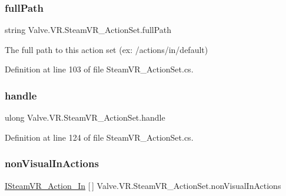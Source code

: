 \subsubsection{\texorpdfstring{fullPath}{fullPath}}
{\footnotesize\ttfamily string Valve.\+V\+R.\+Steam\+V\+R\+\_\+\+Action\+Set.\+full\+Path\hspace{0.3cm}{\ttfamily [get]}}



The full path to this action set (ex\+: /actions/in/default) 



Definition at line 103 of file Steam\+V\+R\+\_\+\+Action\+Set.\+cs.

\mbox{\label{class_valve_1_1_v_r_1_1_steam_v_r___action_set_ae8d12a8a8939aca9bc09d5b2e6863539}} 
\subsubsection{\texorpdfstring{handle}{handle}}
{\footnotesize\ttfamily ulong Valve.\+V\+R.\+Steam\+V\+R\+\_\+\+Action\+Set.\+handle\hspace{0.3cm}{\ttfamily [get]}}



Definition at line 124 of file Steam\+V\+R\+\_\+\+Action\+Set.\+cs.

\mbox{\label{class_valve_1_1_v_r_1_1_steam_v_r___action_set_ac0c94124b2bccf8f0af077de0191e000}} 
\subsubsection{\texorpdfstring{nonVisualInActions}{nonVisualInActions}}
{\footnotesize\ttfamily \mbox{\hyperlink{interface_valve_1_1_v_r_1_1_i_steam_v_r___action___in}{I\+Steam\+V\+R\+\_\+\+Action\+\_\+\+In}} \mbox{[}$\,$\mbox{]} Valve.\+V\+R.\+Steam\+V\+R\+\_\+\+Action\+Set.\+non\+Visual\+In\+Actions\hspace{0.3cm}{\ttfamily [get]}}



